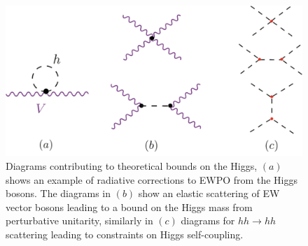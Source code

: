 \begin{figure}[t!]
	\begin{center}
		\includegraphics[width=.7 \linewidth]{figures/theoretical_const}
		\caption{Diagrams contributing to theoretical bounds on the Higgs, $(a) $ shows an example of radiative corrections to EWPO from the Higgs bosons. The diagrams in $(b)$ show an elastic scattering of EW vector bosons leading to a bound on the Higgs mass from perturbative unitarity, similarly in $(c)$ diagrams for $hh \to hh$ scattering leading to constraints on Higgs self-coupling.}
		\label{fig:ewdiagrams}
	\end{center}
\end{figure}
